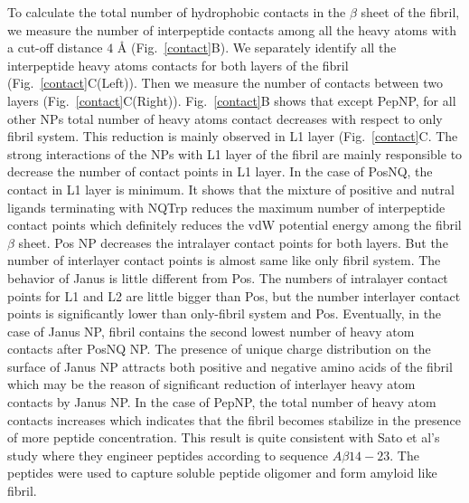 \documentclass[journal=jacsat,manuscript=communication]{achemso}
\begin{document}
To calculate the total number of hydrophobic contacts in the $\beta$ sheet of
the fibril, we measure the number of interpeptide contacts among all the heavy
atoms with a cut-off distance $4$ {\AA} (Fig.~\ref{contact}B). We separately
identify all the interpeptide heavy atoms contacts for both layers of the fibril
(Fig.~\ref{contact}C(Left)). Then we measure the number of contacts between two
layers (Fig.~\ref{contact}C(Right)). Fig.~\ref{contact}B shows that except
PepNP, for all other NPs total number of heavy atoms contact decreases with
respect to only fibril system.  This reduction is mainly observed in L1 layer
(Fig.~\ref{contact}C. The strong interactions of the NPs with L1 layer of the
fibril are mainly responsible to decrease the number of contact points in L1
layer.  In the case of PosNQ, the contact in L1 layer is minimum. It shows that
the mixture of positive and nutral ligands terminating with NQTrp reduces the
maximum number of interpeptide contact points which definitely reduces the vdW
potential energy among the fibril $\beta$ sheet. Pos NP decreases the intralayer
contact points for both layers. But the number of interlayer contact points is
almost same like only fibril system. The behavior of Janus is little different
from Pos. The numbers of intralayer contact points for L1 and L2 are little
bigger than Pos, but the number interlayer contact points is significantly lower
than only-fibril system and Pos. Eventually, in the case of Janus NP, fibril
contains the second lowest number of heavy atom contacts after PosNQ NP. The
presence of unique charge distribution on the surface of Janus NP attracts both
positive and negative amino acids of the fibril which may be the reason of
significant reduction of interlayer heavy atom contacts by Janus NP.  In the
case of PepNP, the total number of heavy atom contacts increases which indicates
that the fibril becomes stabilize in the presence of more peptide concentration.
This result is quite consistent with Sato et al's \cite{Sato2007}study where
they engineer peptides according to sequence $A\beta14-23$. The peptides were
used to capture soluble peptide oligomer and form amyloid like fibril.

\end{document}
